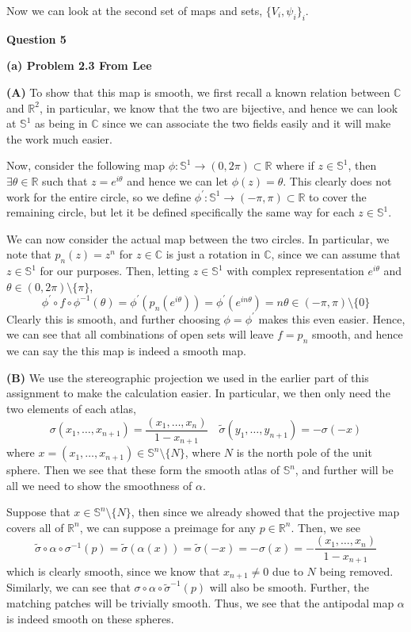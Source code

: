 \documentclass[10pt]{article}
\newcommand{\R}{\mathbb{R}}
\newcommand{\C}{\mathbb{C}}
\newcommand{\Sp}{\mathbb{S}}
\begin{document}
Now we can look at the second set of maps and sets, $\{V_{i},\psi_{i}\}_{i}$.

\newpage

\textbf{Question 5}

\textbf{(a) Problem 2.3 From Lee}

\textbf{(A)} To show that this map is smooth, we first recall a known relation between $\C$ and $\R^{2}$, in particular, we know that the two are bijective, and hence we can look at $\Sp^{1}$ as being in $\C$ since we can associate the two fields easily and it will make the work much easier.

Now, consider the following map $\phi: \Sp^{1} \to (0,2\pi) \subset \R$ where if $z \in \Sp^{1}$, then $\exists \theta \in \R$ such that $z = e^{i\theta}$ and hence we can let $\phi(z) = \theta$. This clearly does not work for the entire circle, so we define $\phi^{\prime}: \Sp^{1} \to (-\pi,\pi) \subset \R$ to cover the remaining circle, but let it be defined specifically the same way for each $z\in \Sp^{1}$.

We can now consider the actual map between the two circles. In particular, we note that $p_{n}(z) = z^{n}$ for $z\in \C$ is just a rotation in $\C$, since we can assume that $z\in \Sp^{1}$ for our purposes. Then, letting $z\in \Sp^{1}$ with complex representation $e^{i\theta}$ and $\theta\in (0,2\pi)\setminus \{\pi\}$,
$$\phi^{\prime}\circ f \circ \phi^{-1} (\theta) = \phi^{\prime}\left(p_{n}(e^{i\theta})\right) = \phi^{\prime}\left(e^{in\theta}\right) = n\theta \in (-\pi,\pi)\setminus\{0\}$$
Clearly this is smooth, and further choosing $\phi = \phi^{\prime}$ makes this even easier. Hence, we can see that all combinations of open sets will leave $f = p_{n}$ smooth, and hence we can say the this map is indeed a smooth map.

\textbf{(B)} We use the stereographic projection we used in the earlier part of this assignment to make the calculation easier. In particular, we then only need the two elements of each atlas,
$$\sigma(x_{1},\dots,x_{n+1}) = \frac{(x_{1},\dots,x_{n})}{1-x_{n+1}} \hspace{1em} \tilde{\sigma}(y_{1},\dots,y_{n+1}) = -\sigma(-x)$$
where $x = (x_{1},\dots,x_{n+1})\in \Sp^{n}\setminus \{N\}$, where $N$ is the north pole of the unit sphere. Then we see that these form the smooth atlas of $\Sp^{n}$, and further will be all we need to show the smoothness of $\alpha$.

Suppose that $x\in \Sp^{n}\setminus \{N\}$, then since we already showed that the projective map covers all of $\R^{n}$, we can suppose a preimage for any $p\in \R^{n}$. Then, we see
$$\tilde{\sigma} \circ \alpha \circ \sigma^{-1} (p) = \tilde{\sigma}(\alpha(x)) = \tilde{\sigma}(-x) = -\sigma(x) = -\frac{(x_{1},\dots,x_{n})}{1-x_{n+1}}$$
which is clearly smooth, since we know that $x_{n+1} \neq 0$ due to $N$ being removed. Similarly, we can see that $\sigma \circ \alpha \circ \tilde{\sigma}^{-1} (p)$ will also be smooth. Further, the matching patches will be trivially smooth. Thus, we see that the antipodal map $\alpha$ is indeed smooth on these spheres.
\end{document}
